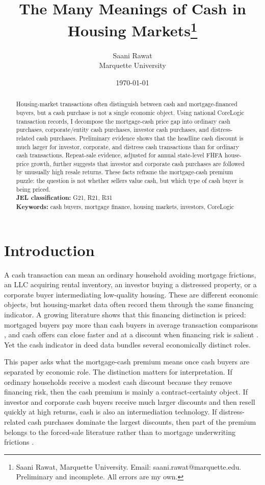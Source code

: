 \documentclass[12pt, letterpaper]{article}
\title{The Many Meanings of Cash in Housing Markets\thanks{Saani Rawat, Marquette University. Email: saani.rawat@marquette.edu. Preliminary and incomplete. All errors are my own.}}
\author{Saani Rawat\\Marquette University}
\date{\today}
\begin{document}
\maketitle

\begin{abstract}
\noindent Housing-market transactions often distinguish between cash and mortgage-financed buyers, but a cash purchase is not a single economic object. Using national CoreLogic transaction records, I decompose the mortgage-cash price gap into ordinary cash purchases, corporate/entity cash purchases, investor cash purchases, and distress-related cash purchases. Preliminary evidence shows that the headline cash discount is much larger for investor, corporate, and distress cash transactions than for ordinary cash transactions. Repeat-sale evidence, adjusted for annual state-level FHFA house-price growth, further suggests that investor and corporate cash purchases are followed by unusually high resale returns. These facts reframe the mortgage-cash premium puzzle: the question is not whether sellers value cash, but which type of cash buyer is being priced. \\[4pt]
\textbf{JEL classification:} G21, R21, R31 \\
\textbf{Keywords:} cash buyers, mortgage finance, housing markets, investors, CoreLogic
\end{abstract}

\section{Introduction}\label{sec:intro}

A cash transaction can mean an ordinary household avoiding mortgage frictions, an LLC acquiring rental inventory, an investor buying a distressed property, or a corporate buyer intermediating low-quality housing. These are different economic objects, but housing-market data often record them through the same financing indicator. A growing literature shows that this financing distinction is priced: mortgaged buyers pay more than cash buyers in average transaction comparisons \citep{reher2024mortgagecash}, and cash offers can close faster and at a discount when financing risk is salient \citep{han2024cashking}. Yet the cash indicator in deed data bundles several economically distinct roles.

This paper asks what the mortgage-cash premium means once cash buyers are separated by economic role. The distinction matters for interpretation. If ordinary households receive a modest cash discount because they remove financing risk, then the cash premium is mainly a contract-certainty object. If investor and corporate cash buyers receive much larger discounts and then resell quickly at high returns, cash is also an intermediation technology. If distress-related cash purchases dominate the largest discounts, then part of the premium belongs to the forced-sale literature rather than to mortgage underwriting frictions \citep{campbell2011forcedsales}.
\end{document}
